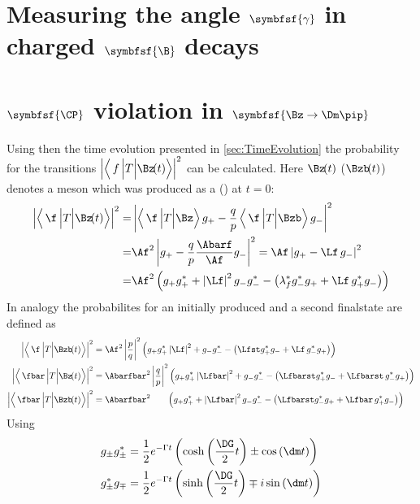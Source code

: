 \section[head={Measuring the angle $\gamma$ in charged \B decays},tocentry={Measuring the angle $\gamma$ in charged \B decays}]{Measuring the angle $\symbfsf{\gamma}$ in charged $\symbfsf{\B}$ decays}
\label{sec:gammainChargedModes}

\Blindtext

\section[head={\CP violation in $\Bz\to\Dm\pip$},tocentry={\CP violation in $\Bz\to\Dm\pip$}]{$\symbfsf{\CP}$ violation in $\symbfsf{\Bz\to\Dm\pip}$}
\label{sec:cpvInBd2Dpi}

Using then the time evolution presented in \cref{sec:TimeEvolution} the probability for the transitions $\left|\left<\,f\,\Big|T\Big|\Bz\!(t)\right>\right|^2$ can be calculated.
Here $\Bz\!(t)$ ($\Bzb\!(t)$) denotes a \B meson which was produced as a \Bz (\Bzb) at $t=0$:
\begin{align}
\left|\left<\,\f\,\Big|T\Big|\Bz\!(t)\right>\right|^2 =&
\left|\left<\,\f\,\Big|T\Big|\Bz\right>g_+-\frac{q}{p}\left<\,\f\,\Big|T\Big|\Bzb\right>g_-\right|^2\nonumber\\
=&\Af^2\left|g_+ - \frac{q}{p}\frac{\Abarf}{\Af} g_-\right|^2=\Af\left|g_+ -\Lf\,g_-\right|^2\nonumber\\
=&\Af^2\left(g_+g_+^*+\left|\Lf\right|^2g_-g_-^*-\left(\lambda_{f}^*g_-^*g_+ + \Lf\,g_+^* g_-\right)\right)
\end{align}
In analogy the probabilites for an initially produced \Bzb and a second finalstate \fbar are defined as
\begin{align}
\left|\left<\,\f\,\Big|T\Big|\Bzb\!(t)\right>\right|^2 &=
\Af^2\left|\frac{p}{q}\right|^2\left(g_+g_+^*\left|\Lf\right|^2+g_-g_-^*-\left(\Lfst g_+^*g_- + \Lf\,g_-^* g_+\right)\right)\\
\left|\left<\,\fbar\,\Big|T\Big|\Bz\!(t)\right>\right|^2 &=
\Abarfbar^2\left|\frac{q}{p}\right|^2\left(g_+g_+^*\left|\Lfbar\right|^2+g_-g_-^*-\left(\Lfbarst g_+^*g_- + \Lfbarst\,g_-^* g_+\right)\right)\\
\left|\left<\,\fbar\,\Big|T\Big|\Bzb\!(t)\right>\right|^2 &=
\Abarfbar^2\hphantom{\left|\frac{q}{p}\right|^2}\left(g_+g_+^*+\left|\Lfbar\right|^2g_-g_-^*-\left(\Lfbarst g_-^*g_+ + \Lfbar\,g_+^* g_-\right)\right)
\end{align}
Using
\begin{align}
g_{\pm}g_{\pm}^{*} &= \frac{1}{2}e^{-\Gamma t}\left(\cosh\left(\frac{\DG}{2}t\right)\pm\cos\left(\dm t\right)\right)\\
g_{\pm}^*g_{\mp} &=  \frac{1}{2}e^{-\Gamma t}\left(\sinh\left(\frac{\DG}{2}t\right)\mp i\sin\left(\dm t\right)\right)
\end{align}
